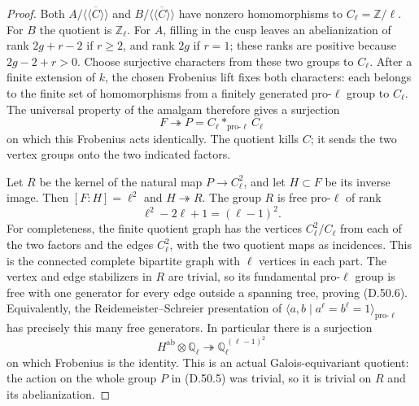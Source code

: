 \begin{proof}
Both \(A/\overline{\langle\!\langle C\rangle\!\rangle}\)
and \(B/\overline{\langle\!\langle C\rangle\!\rangle}\)
have nonzero homomorphisms to \(C_\ell=\mathbb Z/\ell\).
For \(B\) the quotient is \(\mathbb Z_\ell\).
For \(A\), filling in the cusp leaves an abelianization
of rank \(2g+r-2\) if \(r\ge2\), and rank \(2g\)
if \(r=1\); these ranks are positive because
\(2g-2+r>0\).
Choose surjective characters from these two groups
to \(C_\ell\). After a finite extension of \(k\),
the chosen Frobenius lift fixes both characters:
each belongs to the finite set of homomorphisms
from a finitely generated pro-\(\ell\) group to
\(C_\ell\). The universal property of the amalgam
therefore gives a surjection
\[
 F\twoheadrightarrow P=C_\ell*_{\mathrm{pro}\text{-}\ell}C_\ell
                                                               \tag{D.50.5}
\]
on which this Frobenius acts identically.
The quotient kills \(C\); it sends the two vertex
groups onto the two indicated factors.

Let \(R\) be the kernel of the natural map
\(P\to C_\ell^2\), and let \(H\subset F\) be its
inverse image. Then \([F:H]=\ell^2\) and
\(H\twoheadrightarrow R\).
The group \(R\) is free pro-\(\ell\) of rank
\[
                  \ell^2-2\ell+1=(\ell-1)^2.                    \tag{D.50.6}
\]
For completeness, the finite quotient graph has
the vertices \(C_\ell^2/C_\ell\) from each of the
two factors and the edges \(C_\ell^2\), with the
two quotient maps as incidences. This is the
connected complete bipartite graph with \(\ell\)
vertices in each part. The vertex and edge
stabilizers in \(R\) are trivial, so its
fundamental pro-\(\ell\) group is free with
one generator for every edge outside a spanning
tree, proving (D.50.6). Equivalently, the
Reidemeister--Schreier presentation of
\(\langle a,b\mid a^\ell=b^\ell=1\rangle_{\mathrm{pro}\text{-}\ell}\)
has precisely this many free generators.
In particular there is a surjection
\[
 H^{\mathrm{ab}}\otimes\mathbb Q_\ell
       \twoheadrightarrow
       \mathbb Q_\ell^{\,(\ell-1)^2}                            \tag{D.50.7}
\]
on which Frobenius is the identity. This is an
actual Galois-equivariant quotient: the action
on the whole group \(P\) in (D.50.5) was trivial,
so it is trivial on \(R\) and its abelianization.


\end{proof}
